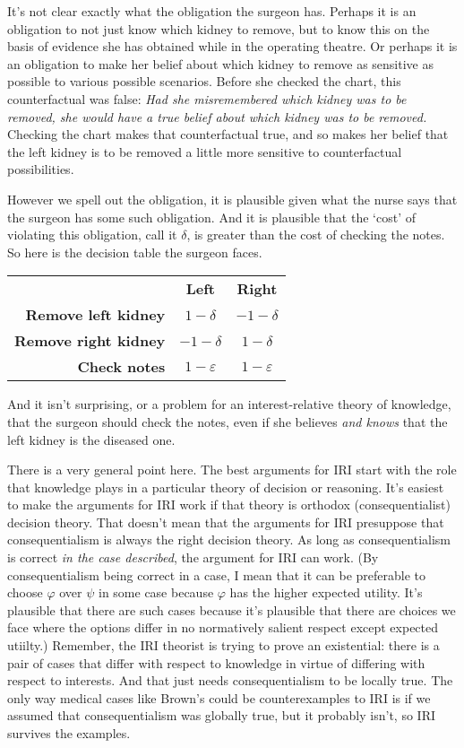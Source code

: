 \documentclass[oneside, a4paper]{book}
\begin{document}
It's not clear exactly what the obligation the surgeon has. Perhaps it is an obligation to not just know which kidney to remove, but to know this on the basis of evidence she has obtained while in the operating theatre. Or perhaps it is an obligation to make her belief about which kidney to remove as sensitive as possible to various possible scenarios. Before she checked the chart, this counterfactual was false: \textit{Had she misremembered which kidney was to be removed, she would have a true belief about which kidney was to be removed.} Checking the chart makes that counterfactual true, and so makes her belief that the left kidney is to be removed a little more sensitive to counterfactual possibilities. 

However we spell out the obligation, it is plausible given what the nurse says that the surgeon has some such obligation. And it is plausible that the `cost' of violating this obligation, call it \(\delta\), is greater than the cost of checking the notes. So here is the decision table the surgeon faces.

\begin{center}
\begin{tabular}{r c c}
 & \textbf{Left} & \textbf{Right} \\
\textbf{Remove left kidney} & \(1-\delta\) & \(-1-\delta\) \\
\textbf{Remove right kidney} & \(-1-\delta\) & \(1-\delta\) \\
\textbf{Check notes} & \(1-\varepsilon\) & \(1-\varepsilon\) \\
\end{tabular}
\end{center}

\noindent And it isn't surprising, or a problem for an interest-relative theory of knowledge, that the surgeon should check the notes, even if she believes \textit{and knows} that the left kidney is the diseased one.

There is a very general point here. The best arguments for IRI start with the role that knowledge plays in a particular theory of decision or reasoning. It's easiest to make the arguments for IRI work if that theory is orthodox (consequentialist) decision theory. That doesn't mean that the arguments for IRI presuppose that consequentialism is always the right decision theory. As long as consequentialism is correct \textit{in the case described}, the argument for IRI can work. (By consequentialism being correct in a case, I mean that it can be preferable to choose $\varphi$ over $\psi$ in some case because $\varphi$ has the higher expected utility. It's plausible that there are such cases because it's plausible that there are choices we face where the options differ in no normatively salient respect except expected utiilty.) Remember, the IRI theorist is trying to prove an existential: there is a pair of cases that differ with respect to knowledge in virtue of differing with respect to interests. And that just needs consequentialism to be locally true. The only way medical cases like Brown's could be counterexamples to IRI is if we assumed that consequentialism was globally true, but it probably isn't, so IRI survives the examples.




\end{document}
